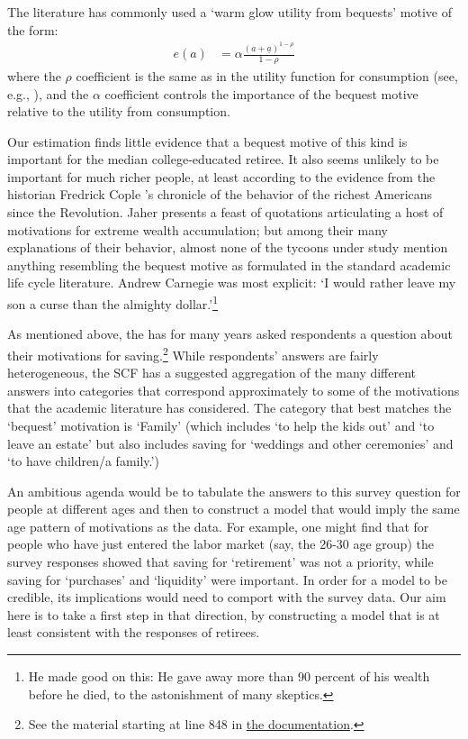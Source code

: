 \documentclass{article}
\newcommand{\CRRA}{\rho}
\newcommand{\bqstNrm}{e}
\begin{document}
The literature has commonly used a `warm glow utility from bequests' motive of the form:
\begin{align}
    \bqstNrm(a) & = \alpha\frac{(a+\underline{a})^{1-\CRRA}}{1-\CRRA}
\end{align}
where the $\CRRA$ coefficient is the same as in the utility function for consumption (see, e.g., \cite{deNardiBequest}), and the $\alpha$ coefficient controls the importance of the bequest motive relative to the utility from consumption.

Our estimation finds little evidence that a bequest motive of this kind is important for the median college-educated retiree.
It also seems unlikely to be important for much richer people, at least according to the evidence from the historian Fredrick Cople \cite{jaherGilded}'s chronicle of the behavior of the richest Americans since the Revolution.
Jaher presents a feast of quotations articulating a host of motivations for extreme wealth accumulation; but among their many explanations of their behavior, almost none of the tycoons under study mention anything resembling the bequest motive as formulated in the standard academic life cycle literature.
Andrew Carnegie was most explicit: `I would rather leave my son a curse than the almighty dollar.'\footnote{He made good on this: He gave away more than 90 percent of his wealth before he died, to the astonishment of many skeptics.}

As mentioned above, the \cite{2023} has for many years asked respondents a question about their motivations for saving.\footnote{See the material starting at line 848 in \href{https://www.federalreserve.gov/econres/files/bulletin.macro.txt}{the documentation}.}
While respondents' answers are fairly heterogeneous, the SCF has a suggested aggregation of the many different answers into categories that correspond approximately to some of the motivations that the academic literature has considered.
The category that best matches the `bequest' motivation is `Family' (which includes `to help the kids out' and `to leave an estate' but also includes saving for `weddings and other ceremonies' and `to have children/a family.')

An ambitious agenda would be to tabulate the answers to this survey question for people at different ages and then to construct a model that would imply the same age pattern of motivations as the data.
For example, one might find that for people who have just entered the labor market (say, the 26-30 age group) the survey responses showed that saving for `retirement' was not a priority, while saving for `purchases' and `liquidity' were important.
In order for a model to be credible, its implications would need to comport with the survey data.
Our aim here is to take a first step in that direction, by constructing a model that is at least consistent with the responses of retirees.
\end{document}
